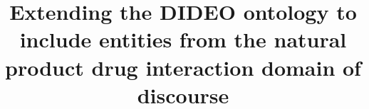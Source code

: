 \documentclass{bmcart}
\begin{document}
\begin{frontmatter}

\begin{fmbox}


\title{Extending the DIDEO ontology to include entities from the natural product drug interaction domain of discourse}


\author[
   addressref={uams},                   %
   corref={uams},                       %
   email={jane.e.doe@cambridge.co.uk}   %
]{ }
\author[
   addressref={uams,aff2},
   email={john.RS.Smith@cambridge.co.uk}
]{ }


\address[id=uams]{%
  , %
  ,                              %
}
\address[id=aff2]{%
  ,
  ,
  ,
}


\end{fmbox}
\end{frontmatter}
\end{document}
